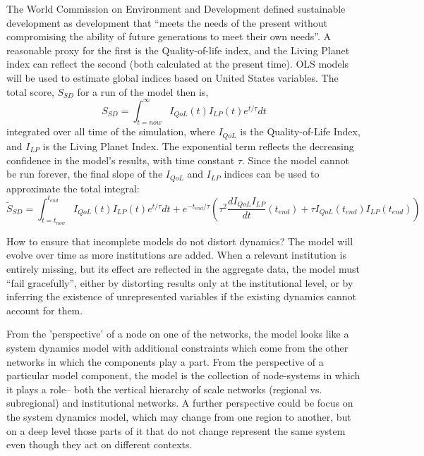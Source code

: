 The World Commission on Environment and Development defined sustainable development as development that ``meets the needs of the present without compromising the ability of future generations to meet their own needs''.  A reasonable proxy for the first is the Quality-of-life index, and the Living Planet index can reflect the second (both calculated at the present time).  OLS models will be used to estimate global indices based on United States variables.  The total score, $S_{SD}$ for a run of the model then is,
\[
S_{SD} = \int_{t=now}^{\infty} I_{QoL}(t) I_{LP}(t) e^{t/\tau} dt
\]
integrated over all time of the simulation, where $I_{QoL}$ is the Quality-of-Life Index, and $I_{LP}$ is the Living Planet Index.  The exponential term reflects the decreasing confidence in the model's results, with time constant $\tau$.  Since the model cannot be run forever, the final slope of the $I_{QoL}$ and $I_{LP}$ indices can be used to approximate the total integral:
\[
\tilde{S}_{SD} = \int_{t=t_{now}}^{t_{end}} I_{QoL}(t) I_{LP}(t) e^{t/\tau} dt + e^{-t_{end}/\tau} \left(\tau^2 \frac{d I_{QoL} I_{LP}}{dt}(t_{end}) + \tau I_{QoL}(t_{end}) I_{LP}(t_{end})\right)
\]


  \item How to ensure that incomplete models do not distort dynamics?  The model will evolve over time as more institutions are added.  When a relevant institution is entirely missing, but its effect are reflected in the aggregate data, the model must ``fail gracefully'', either by distorting results only at the institutional level, or by inferring the existence of unrepresented variables if the existing dynamics cannot account for them.

    From the 'perspective' of a node on one of the networks, the model looks like a system dynamics model with additional constraints which come from the other networks in which the components play a part.  From the perspective of a particular model component, the model is the collection of node-systems in which it plays a role-- both the vertical hierarchy of scale networks (regional vs. subregional) and institutional networks.  A further perspective could be focus on the system dynamics model, which may change from one region to another, but on a deep level those parts of it that do not change represent the same system even though they act on different contexts.


